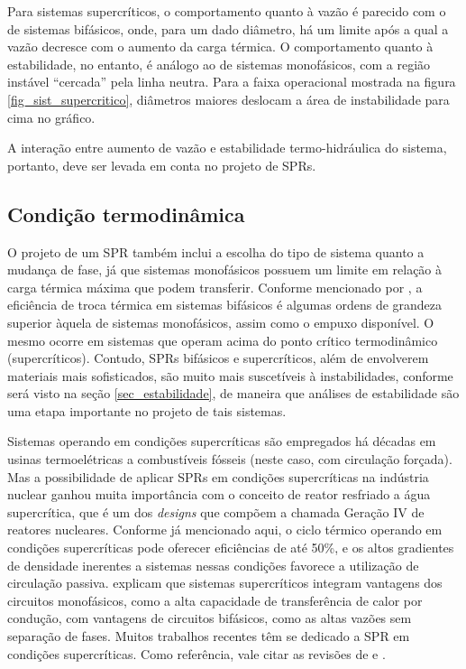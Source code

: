 \documentclass[a4paper,portuguese,10pt]{article}
\begin{document}
Para sistemas supercríticos, o comportamento quanto à vazão é parecido com o de sistemas bifásicos, onde, para um dado diâmetro, há um limite após a qual a vazão decresce com o aumento da carga térmica. O comportamento quanto à estabilidade, no entanto, é análogo ao de sistemas monofásicos, com a região instável ``cercada'' pela linha neutra. Para a faixa operacional mostrada na figura \ref{fig_sist_supercritico}, diâmetros maiores deslocam a área de instabilidade para cima no gráfico.

A interação entre aumento de vazão e estabilidade termo-hidráulica do sistema, portanto, deve ser levada em conta no projeto de SPRs.

\subsection{Condição termodinâmica}

O projeto de um SPR também inclui a escolha do tipo de sistema quanto a mudança de fase, já que sistemas monofásicos possuem um limite em relação à carga térmica máxima que podem transferir. Conforme mencionado por \citet{FUCHS13}, a eficiência de troca térmica em sistemas bifásicos é algumas ordens de grandeza superior àquela de sistemas monofásicos, assim como o empuxo disponível. O mesmo ocorre em sistemas que operam acima do ponto crítico termodinâmico (supercríticos). Contudo, SPRs bifásicos e supercríticos, além de envolverem materiais mais sofisticados, são muito mais suscetíveis à instabilidades, conforme será visto na seção \ref{sec_estabilidade}, de maneira que análises de estabilidade são uma etapa importante no projeto de tais sistemas.

Sistemas operando em condições supercríticas são empregados há décadas em usinas termoelétricas a combustíveis fósseis (neste caso, com circulação forçada). Mas a possibilidade de aplicar SPRs em condições supercríticas na indústria nuclear ganhou muita importância com o conceito de reator resfriado a água supercrítica, que é um dos {\it designs} que compõem a chamada Geração IV de reatores nucleares. Conforme já mencionado aqui, o ciclo térmico operando em condições supercríticas pode oferecer eficiências de até 50\%, e os altos gradientes de densidade inerentes a sistemas nessas condições favorece a utilização de circulação passiva. \citet{SARKAR14} explicam que sistemas supercríticos integram vantagens dos circuitos monofásicos, como a alta capacidade de transferência de calor por condução, com vantagens de circuitos bifásicos, como as altas vazões sem separação de fases. Muitos trabalhos recentes têm se dedicado a SPR em condições supercríticas. Como referência, vale citar as revisões de \citet{SARKAR14} e \citet{SCHULENBERG14}.
\end{document}
